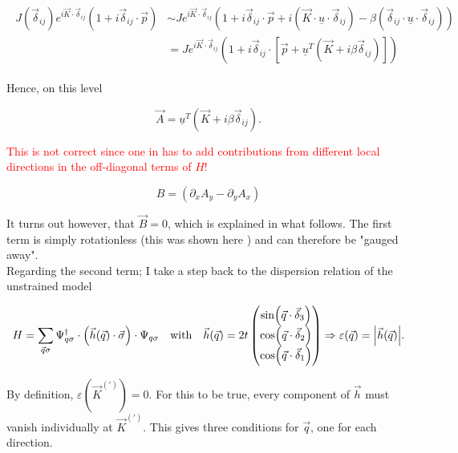 \documentclass[../../../main.tex]{subfiles}
\begin{document}
\begin{align}
	\begin{split}
		J(\vec{\delta}_{ij})e^{i\vec{K}\cdot\vec{\delta}_{ij}}(1+i\vec{\delta}_{ij}\cdot\vec{p}) &\sim  Je^{i\vec{K}\cdot\vec{\delta}_{ij}}\left(1 + i\vec{\delta}_{ij}\cdot\vec{p} + i \left(\vec{K} \cdot \underline{u} \cdot \vec{\delta}_{ij}\right) - \beta\left(\vec{\delta}_{ij} \cdot \underline{u} \cdot \vec{\delta}_{ij}\right)\right)\\ 
		&= Je^{i\vec{K}\cdot\vec{\delta}_{ij}}\left(1 + i \vec{\delta}_{ij}\cdot \left[\vec{p} + \underline{u}^T\left(\vec{K} + i \beta\vec{\delta}_{ij}\right)\right]\right)
	\end{split}
\end{align}

Hence, on this level

\begin{equation}
	\vec{A} = \underline{u}^T\left(\vec{K} + i \beta\vec{\delta}_{ij}\right).
\end{equation}

\textcolor{red}{This is not correct since one in has to add contributions from different local directions in the off-diagonal terms of $H$!}

\begin{equation}
	B = \left(\partial_x A_y - \partial_y A_x\right)
\end{equation}

It turns out however, that $\vec{B}=0$, which is explained in what follows. The first term is simply rotationless (this was shown here \cite{Ramezani_Masir2013}) and can therefore be "gauged away". \\

Regarding the second term; I take a step back to the dispersion relation of the unstrained model

\begin{equation}
	H = \sum_{\vec{q}\sigma} \Psi_{q\sigma}^\dagger \cdot \left( \vec{h}(\vec{q})\cdot \vec{\sigma} \right) \cdot \Psi_{q\sigma} \quad \text{with} \quad \vec{h}(\vec{q}) = 2t
	\begin{pmatrix}
		\sin(\vec{q}\cdot\vec{\delta}_3) \\
		\cos(\vec{q}\cdot\vec{\delta}_2) \\
		\cos(\vec{q}\cdot\vec{\delta}_1)
	\end{pmatrix} \Rightarrow \varepsilon(\vec{q}) = \abs{\vec{h}(\vec{q})}.
\end{equation}

By definition, $\varepsilon(\vec{K}^{(\prime)}) =0$. For this to be true, every component of $\vec{h}$ must vanish individually at $\vec{K}^{(\prime)}$. This gives three conditions for $\vec{q}$, one for each direction. \\
\end{document}
